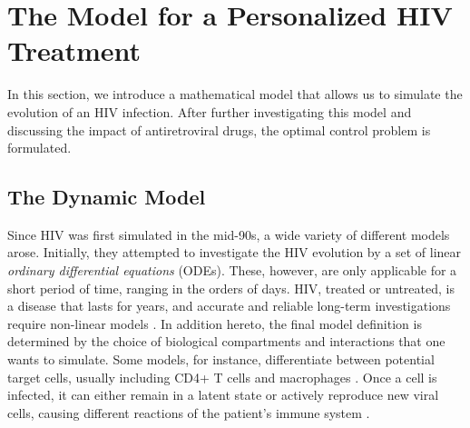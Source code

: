 \section{The Model for a Personalized HIV Treatment}
\label{sec:model}

In this section, we introduce a mathematical model that allows us to simulate the evolution of an HIV infection.
After further investigating this model and discussing the impact of antiretroviral drugs, the optimal control problem is formulated.

\subsection{The Dynamic Model}
\label{subsec:Model_DynModel}

Since HIV was first simulated in the mid-90s, a wide variety of different models arose.
Initially, they attempted to investigate the HIV evolution by a set of linear \textit{ordinary differential 
equations} (ODEs). These, however, are only applicable for a short period of time, ranging in the orders of days.
HIV, treated or untreated, is a disease that lasts for years, and accurate and reliable long-term investigations 
require non-linear models \cite{adams2005hiv}.\newline
In addition hereto, the final model definition is determined by the choice of biological compartments and interactions 
that one wants to simulate.
Some models, for instance, differentiate between potential target cells, usually including CD4+ T cells and macrophages \cite{perelson1993dynamics}.
Once a cell is infected, it can either remain in a latent state or actively reproduce new viral cells, causing different reactions of 
the patient’s immune system \cite{anderson1998complex}.\par

